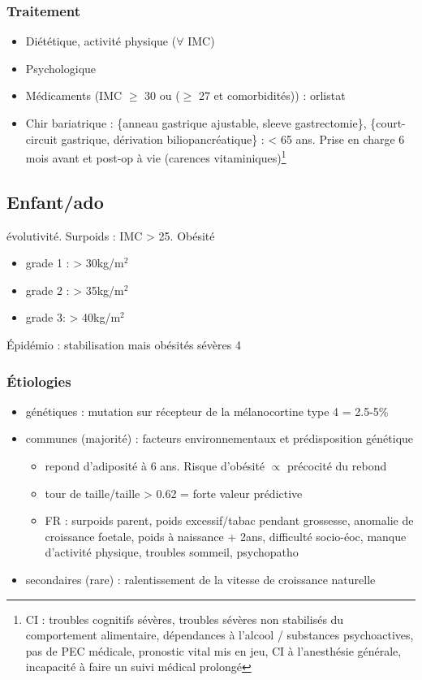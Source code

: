\documentclass{book}
\begin{document}
\subsubsection{Traitement}
\label{sec:org22c26ac}
\begin{itemize}
\item Diététique, activité physique (\(\forall\) IMC)
\item Psychologique
\item Médicaments (IMC \(\ge\) 30 ou (\(\ge\) 27 et comorbidités)) : orlistat
\item Chir bariatrique :  \{anneau gastrique ajustable, sleeve gastrectomie\},
\{court-circuit gastrique, dérivation biliopancréatique\} : < 65 ans. Prise en
charge 6 mois avant et post-op à vie (carences vitaminiques)\footnote{CI : troubles cognitifs sévères, troubles sévères non stabilisés du
comportement alimentaire, dépendances à l'alcool / substances psychoactives, pas
de PEC médicale, pronostic vital mis en jeu, CI à l'anesthésie générale,
incapacité à faire un suivi médical prolongé}
\end{itemize}
\subsection{Enfant/ado}
\label{sec:org46fadf7}
\danger{} évolutivité. Surpoids : IMC > 25. Obésité 
\begin{itemize}
\item grade 1 : > 30kg/m\(^{\text{2}}\)
\item grade 2 : > 35kg/m\(^{\text{2}}\)
\item grade 3: > 40kg/m\(^{\text{2}}\)
\end{itemize}

Épidémio : stabilisation mais obésités sévères \texttimes{}4

\subsubsection{Étiologies}
\label{sec:org0472740}
\begin{itemize}
\item génétiques : mutation sur récepteur de la mélanocortine type 4 = 2.5-5\%
\item communes (majorité) : facteurs environnementaux et prédisposition génétique
\begin{itemize}
\item repond d'adiposité à 6 ans. Risque d'obésité \(\propto\) précocité du rebond
\item tour de taille/taille > 0.62 = forte valeur prédictive
\item FR : surpoids parent, poids excessif/tabac pendant grossesse, anomalie de
croissance foetale, \inc\inc poids à naissance + 2ans, difficulté
socio-éoc, manque d'activité physique, troubles sommeil, psychopatho
\end{itemize}
\item secondaires (rare) : ralentissement de la vitesse de croissance naturelle
\end{itemize}
\end{document}
